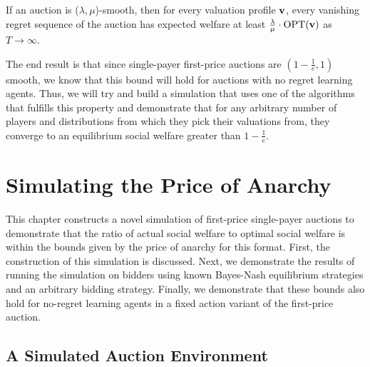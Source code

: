 \documentclass[12pt,twoside]{reedthesis}
\begin{document}
\begin{theorem}
	If an auction is ($\lambda, \mu$)-smooth, then for every valuation profile $\textbf{v}$, every vanishing regret sequence of the auction has expected welfare at least $\frac{\lambda}{\mu} \cdot \text{OPT}(\textbf{v})$ as $T \rightarrow \infty$.  
\end{theorem}

The end result is that since single-payer first-price auctions are $(1-\frac{1}{e}, 1)$ smooth, we know that this bound will hold for auctions with no regret learning agents. Thus, we will try and build a simulation that uses one of the algorithms that fulfills this property and demonstrate that for any arbitrary number of players and distributions from which they pick their valuations from, they converge to an equilibrium social welfare greater than $1-\frac{1}{e}$.

\chapter{Simulating the Price of Anarchy}

This chapter constructs a novel simulation of first-price single-payer auctions to demonstrate that the ratio of actual social welfare to optimal social welfare is within the bounds given by the price of anarchy for this format. First, the construction of this simulation is discussed. Next, we demonstrate the results of running the simulation on bidders using known Bayes-Nash equilibrium strategies and an arbitrary bidding strategy. Finally, we demonstrate that these bounds also hold for no-regret learning agents in a fixed action variant of the first-price auction.

\section{A Simulated Auction Environment}
\end{document}
